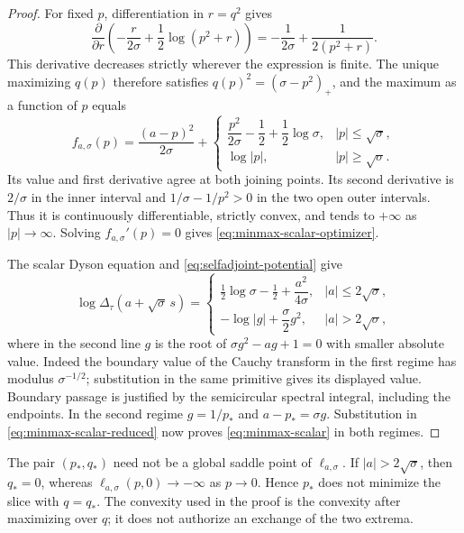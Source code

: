 \begin{proof}
For fixed $p$, differentiation in $r=q^2$ gives
\[
 \frac{\partial}{\partial r}
 \left(-\frac r{2\sigma}+\frac12\log(p^2+r)\right)
 =-\frac1{2\sigma}+\frac1{2(p^2+r)}.
\]
This derivative decreases strictly wherever the expression is finite.
The unique maximizing $q(p)$ therefore satisfies $q(p)^2=(\sigma-p^2)_+$, and the maximum as a function of $p$ equals
\begin{equation}\label{eq:minmax-scalar-reduced}
 f_{a,\sigma}(p)=\frac{(a-p)^2}{2\sigma}
 +\begin{cases}
    \dfrac{p^2}{2\sigma}-\dfrac12+\dfrac12\log\sigma,
          &|p|\le\sqrt\sigma,\\[3pt]
    \log|p|,&|p|\ge\sqrt\sigma.
  \end{cases}
\end{equation}
Its value and first derivative agree at both joining points.
Its second derivative is $2/\sigma$ in the inner interval and $1/\sigma-1/p^2>0$ in the two open outer intervals.
Thus it is continuously differentiable, strictly convex, and tends to $+\infty$ as $|p|\to\infty$.
Solving $f_{a,\sigma}'(p)=0$ gives \eqref{eq:minmax-scalar-optimizer}.

The scalar Dyson equation and \eqref{eq:selfadjoint-potential} give
\[
 \log\Delta_\tau(a+\sqrt\sigma\,s)
 =\begin{cases}
   \frac12\log\sigma-\frac12+\dfrac{a^2}{4\sigma},
              &|a|\le2\sqrt\sigma,\\[3pt]
   -\log|g|+\dfrac\sigma2g^2,&|a|>2\sqrt\sigma,
  \end{cases}
\]
where in the second line $g$ is the root of $\sigma g^2-ag+1=0$ with smaller absolute value.
Indeed the boundary value of the Cauchy transform in the first regime has modulus $\sigma^{-1/2}$; substitution in the same primitive gives its displayed value.
Boundary passage is justified by the semicircular spectral integral, including the endpoints.
In the second regime $g=1/p_*$ and $a-p_*=\sigma g$.
Substitution in \eqref{eq:minmax-scalar-reduced} now proves \eqref{eq:minmax-scalar} in both regimes.
\end{proof}

The pair $(p_*,q_*)$ need not be a global saddle point of $\ell_{a,\sigma}$.
If $|a|>2\sqrt\sigma$, then $q_*=0$, whereas $\ell_{a,\sigma}(p,0)\to-\infty$ as $p\to0$.
Hence $p_*$ does not minimize the slice with $q=q_*$.
The convexity used in the proof is the convexity after maximizing over $q$; it does not authorize an exchange of the two extrema.


